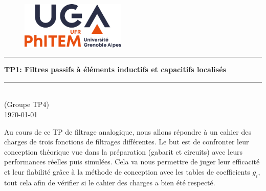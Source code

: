 \thispagestyle{empty} %
\setcounter{page}{0} %

\begin{figure}[H]
\centering
\includegraphics[width=5cm]{./extras/logos/logo.pdf}
\end{figure}

\vspace{3cm}

\begin{center}

{\color{orange}\rule{\linewidth}{0.8mm}}
\vspace*{0mm}

\Huge{\textbf{TP1: Filtres passifs à éléments
inductifs et capacitifs localisés}}
{\color{orange}\rule{\linewidth}{0.8mm}}

\vspace{0.5cm}
\Large{\theauthor} \\
\small{(Groupe TP4)}\\
\Large{\today}
\end{center}
 
\vspace{3cm}

\begin{myabstract}
Au cours de ce TP de filtrage analogique, nous allons répondre à un cahier des charges de trois fonctions de filtrages différentes. 
Le but est de confronter leur conception théorique vue dans la préparation (gabarit et circuits) avec leurs performances réelles puis simulées.
Cela va nous permettre de juger leur efficacité et leur fiabilité grâce à la méthode de conception avec les tables de coefficients $g_i$, tout cela afin de vérifier si le cahier des charges a bien été respecté.
\end{myabstract}

\clearpage
